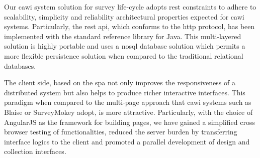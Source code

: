 	Our \gls{cawi} system solution for survey life-cycle adopts \gls{rest} constraints to adhere to scalability, simplicity and reliability architectural properties expected for \gls{cawi} systems. Particularly, the \gls{rest} \gls{api}, which conforms to the \gls{http} protocol, has been implemented with the standard reference library for Java. This multi-layered solution is highly portable and uses a \gls{nosql} database solution which permits a more flexible persistence solution when compared to the traditional relational databases.

	The client side, based on the \gls{spa} not only improves the responsiveness of a distributed system but also helps to produce richer interactive interfaces. This paradigm when compared to the multi-page approach that \gls{cawi} systems such as Blaise or SurveyMokey adopt, is more attractive. Particularly, with the choice of AngularJS as the framework for building pages, we have gained a simplified cross browser testing of functionalities, reduced the server burden by transferring interface logics to the client and promoted a parallel development of design and collection interfaces.
